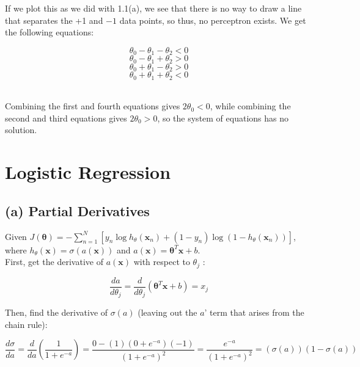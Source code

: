 \documentclass[11pt]{article}
\newcommand{\sol}[1]{{\bf{\color{magenta}{{Solution:}}}}}
\begin{document}
If we plot this as we did with 1.1(a), we see that there is no way to draw a line that separates the +1 and $-1$ data points, so thus, no perceptron exists. We get the following equations:

$$\theta_0 - \theta_1 - \theta_2 < 0$$
$$\theta_0 - \theta_1 + \theta_2 > 0$$
$$\theta_0 + \theta_1 - \theta_2 > 0$$
$$\theta_0 + \theta_1 + \theta_2 < 0$$

\\

Combining the first and fourth equations gives $2\theta_0 < 0$, while combining the second and third equations gives $2\theta_0 > 0$, so the system of equations has no solution.

\section{Logistic Regression}

\subsection{(a) Partial Derivatives}
\sol x Given $J(\boldsymbol{\theta})=-\sum_{n=1}^{N}\left[y_{n} \log h_{\theta}\left(\mathbf{x}_{n}\right)+\left(1-y_{n}\right) \log \left(1-h_{\theta}\left(\mathbf{x}_{n}\right)\right)\right]$, where $h_{\theta}(\mathbf{x})=\sigma(a(\mathbf{x}))$ and $a(\mathbf{x})=\boldsymbol{\theta}^{T} \mathbf{x}+b$. \\

First, get the derivative of $a(\mathbf{x})$ with respect to $\theta_{j}$ :

$$
\frac{d a}{d \theta_{j}}=\frac{d}{d \theta_{j}}\left(\boldsymbol{\theta}^{T} \mathbf{x}+b\right)=x_{j}
$$

Then, find the derivative of $\sigma(a)$ (leaving out the $a$' term that arises from the chain rule):

$$
\frac{d \sigma}{d a}=\frac{d}{d a}\left(\frac{1}{1+e^{-a}}\right)=\frac{0-(1)\left(0+e^{-a}\right)(-1)}{\left(1+e^{-a}\right)^{2}}=\frac{e^{-a}}{\left(1+e^{-a}\right)^{2}}=(\sigma(a))(1-\sigma(a))
$$
\end{document}
